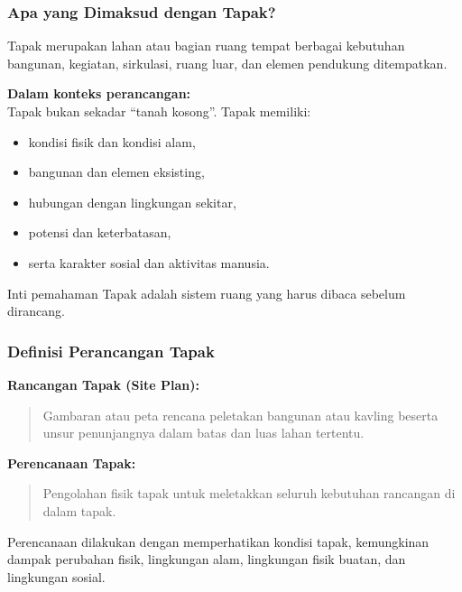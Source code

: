 \documentclass[../main.tex]{subfiles}
\begin{document}
\begin{frame}[mytitle=standard, c, mycolor=digiPH_gray, light]
	\frametitle{Apa yang Dimaksud dengan Tapak?}

	Tapak merupakan lahan atau bagian ruang tempat berbagai kebutuhan bangunan, kegiatan, sirkulasi, ruang luar, dan elemen pendukung ditempatkan.

	\vspace{0.3cm}
	\textbf{Dalam konteks perancangan:} \\
	Tapak bukan sekadar ``tanah kosong''. Tapak memiliki:
	\begin{itemize}
		\item kondisi fisik dan kondisi alam,
		\item bangunan dan elemen eksisting,
		\item hubungan dengan lingkungan sekitar,
		\item potensi dan keterbatasan,
		\item serta karakter sosial dan aktivitas manusia.
	\end{itemize}

	\vspace{0.3cm}
	\begin{alertblock}{Inti pemahaman}
		Tapak adalah sistem ruang yang harus dibaca sebelum dirancang.
	\end{alertblock}
\end{frame}

\begin{frame}[mytitle=standard, t, mycolor=digiPH_white, light]
	\frametitle{Definisi Perancangan Tapak}

	\textbf{Rancangan Tapak (Site Plan):}
	\begin{quote}
		Gambaran atau peta rencana peletakan bangunan atau kavling beserta unsur penunjangnya dalam batas dan luas lahan tertentu.
	\end{quote}

	\textbf{Perencanaan Tapak:}
	\begin{quote}
		Pengolahan fisik tapak untuk meletakkan seluruh kebutuhan rancangan di dalam tapak.
	\end{quote}

	\vspace{0.3cm}
	Perencanaan dilakukan dengan memperhatikan kondisi tapak, kemungkinan dampak perubahan fisik, lingkungan alam, lingkungan fisik buatan, dan lingkungan sosial.
\end{frame}
\end{document}
